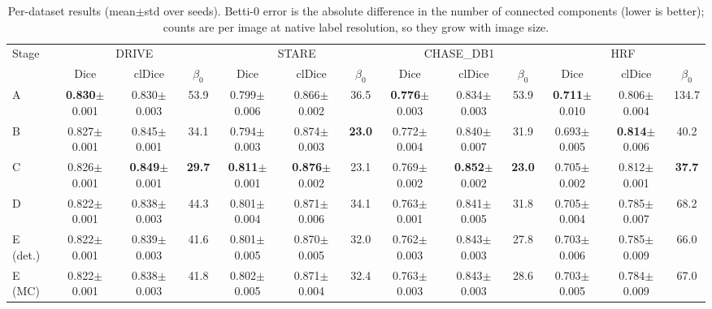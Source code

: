 \begin{table}[t]
\centering
\caption{Per-dataset results (mean$\pm$std over seeds). Betti-0 error is the absolute difference in the number of connected components (lower is better); counts are per image at native label resolution, so they grow with image size.}
\label{tab:datasets}
\small
\begin{adjustbox}{max width=\textwidth}\begin{tabular}{l ccc ccc ccc ccc}
\toprule
Stage & \multicolumn{3}{c}{DRIVE} & \multicolumn{3}{c}{STARE} & \multicolumn{3}{c}{CHASE\_DB1} & \multicolumn{3}{c}{HRF} \\
\cmidrule(lr){2-4} \cmidrule(lr){5-7} \cmidrule(lr){8-10} \cmidrule(lr){11-13}
 & Dice & clDice & $\beta_0$ & Dice & clDice & $\beta_0$ & Dice & clDice & $\beta_0$ & Dice & clDice & $\beta_0$ \\
\midrule
A & \textbf{0.830}{\scriptsize$\pm$0.001} & 0.830{\scriptsize$\pm$0.003} & 53.9 & 0.799{\scriptsize$\pm$0.006} & 0.866{\scriptsize$\pm$0.002} & 36.5 & \textbf{0.776}{\scriptsize$\pm$0.003} & 0.834{\scriptsize$\pm$0.003} & 53.9 & \textbf{0.711}{\scriptsize$\pm$0.010} & 0.806{\scriptsize$\pm$0.004} & 134.7 \\
B & 0.827{\scriptsize$\pm$0.001} & 0.845{\scriptsize$\pm$0.001} & 34.1 & 0.794{\scriptsize$\pm$0.003} & 0.874{\scriptsize$\pm$0.003} & \textbf{23.0} & 0.772{\scriptsize$\pm$0.004} & 0.840{\scriptsize$\pm$0.007} & 31.9 & 0.693{\scriptsize$\pm$0.005} & \textbf{0.814}{\scriptsize$\pm$0.006} & 40.2 \\
C & 0.826{\scriptsize$\pm$0.001} & \textbf{0.849}{\scriptsize$\pm$0.001} & \textbf{29.7} & \textbf{0.811}{\scriptsize$\pm$0.001} & \textbf{0.876}{\scriptsize$\pm$0.002} & 23.1 & 0.769{\scriptsize$\pm$0.002} & \textbf{0.852}{\scriptsize$\pm$0.002} & \textbf{23.0} & 0.705{\scriptsize$\pm$0.002} & 0.812{\scriptsize$\pm$0.001} & \textbf{37.7} \\
D & 0.822{\scriptsize$\pm$0.001} & 0.838{\scriptsize$\pm$0.003} & 44.3 & 0.801{\scriptsize$\pm$0.004} & 0.871{\scriptsize$\pm$0.006} & 34.1 & 0.763{\scriptsize$\pm$0.001} & 0.841{\scriptsize$\pm$0.005} & 31.8 & 0.705{\scriptsize$\pm$0.004} & 0.785{\scriptsize$\pm$0.007} & 68.2 \\
E (det.) & 0.822{\scriptsize$\pm$0.001} & 0.839{\scriptsize$\pm$0.003} & 41.6 & 0.801{\scriptsize$\pm$0.005} & 0.870{\scriptsize$\pm$0.005} & 32.0 & 0.762{\scriptsize$\pm$0.003} & 0.843{\scriptsize$\pm$0.003} & 27.8 & 0.703{\scriptsize$\pm$0.006} & 0.785{\scriptsize$\pm$0.009} & 66.0 \\
E (MC) & 0.822{\scriptsize$\pm$0.001} & 0.838{\scriptsize$\pm$0.003} & 41.8 & 0.802{\scriptsize$\pm$0.005} & 0.871{\scriptsize$\pm$0.004} & 32.4 & 0.763{\scriptsize$\pm$0.003} & 0.843{\scriptsize$\pm$0.003} & 28.6 & 0.703{\scriptsize$\pm$0.005} & 0.784{\scriptsize$\pm$0.009} & 67.0 \\
\bottomrule
\end{tabular}\end{adjustbox}
\end{table}